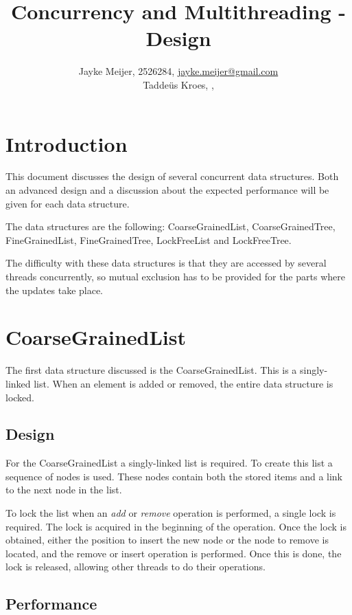 \documentclass[a4paper]{article}
\title{Concurrency and Multithreading - Design}
\author{Jayke Meijer, 2526284, \url{jayke.meijer@gmail.com} \\
Tadde\"us Kroes, , \url{}}
\begin{document}
\maketitle
\pagebreak

\tableofcontents
\pagebreak

\section{Introduction}

This document discusses the design of several concurrent data
structures. Both an advanced design and a discussion about the
expected performance will be given for each data structure.

The data structures are the following: CoarseGrainedList,
CoarseGrainedTree, FineGrainedList, FineGrainedTree,
LockFreeList and LockFreeTree.

The difficulty with these data structures is that they are
accessed by several threads concurrently, so mutual exclusion has
to be provided for the parts where the updates take place.

\section{CoarseGrainedList}

The first data structure discussed is the CoarseGrainedList.
This is a singly-linked list. When an element is added or removed,
the entire data structure is locked.

\subsection{Design}

For the CoarseGrainedList a singly-linked list is required. To create this
list a sequence of nodes is used. These nodes contain both the stored items
and a link to the next node in the list.

To lock the list when an \emph{add} or \emph{remove} operation is performed,
a single lock is required. The lock is acquired in the beginning of the
operation. Once the lock is obtained, either the position to insert the new
node or the node to remove is located, and the remove or insert operation is
performed. Once this is done, the lock is released, allowing
other threads to do their operations.

\subsection{Performance}
\end{document}
